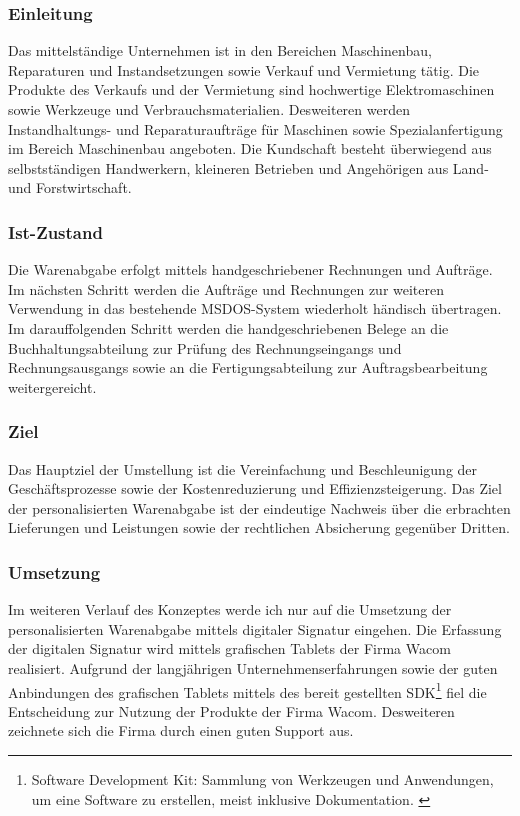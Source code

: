 \subsubsection*{Einleitung}
Das mittelständige Unternehmen ist in den Bereichen Maschinenbau, Reparaturen und Instandsetzungen sowie Verkauf und Vermietung tätig. Die Produkte des Verkaufs und der Vermietung sind hochwertige Elektromaschinen sowie Werkzeuge und Verbrauchsmaterialien. Desweiteren werden Instandhaltungs- und Reparaturaufträge für Maschinen sowie Spezialanfertigung im Bereich Maschinenbau angeboten. Die Kundschaft besteht überwiegend aus selbstständigen Handwerkern, kleineren Betrieben und Angehörigen aus Land- und Forstwirtschaft.
\subsubsection*{Ist-Zustand}
Die Warenabgabe erfolgt mittels handgeschriebener Rechnungen und Aufträge. Im nächsten Schritt werden die Aufträge und Rechnungen zur weiteren Verwendung in das bestehende MSDOS-System wiederholt händisch übertragen. Im darauffolgenden Schritt werden die handgeschriebenen Belege an die Buchhaltungsabteilung zur Prüfung des Rechnungseingangs und Rechnungsausgangs sowie an die Fertigungsabteilung zur Auftragsbearbeitung weitergereicht.
\subsubsection*{Ziel}
Das Hauptziel der Umstellung ist die Vereinfachung und Beschleunigung der Geschäftsprozesse sowie der Kostenreduzierung und Effizienzsteigerung. Das Ziel der personalisierten Warenabgabe ist der eindeutige Nachweis über die erbrachten Lieferungen und Leistungen sowie der rechtlichen Absicherung gegenüber Dritten. \cite{einleitung1}
\subsubsection*{Umsetzung}
Im weiteren Verlauf des Konzeptes werde ich nur auf die Umsetzung der personalisierten Warenabgabe mittels digitaler Signatur eingehen. Die Erfassung der digitalen Signatur wird mittels grafischen Tablets der Firma Wacom realisiert. Aufgrund der langjährigen Unternehmenserfahrungen sowie der guten Anbindungen des grafischen Tablets mittels des bereit gestellten SDK\footnote{\label{foot:4} Software Development Kit: Sammlung von Werkzeugen und Anwendungen, um eine Software zu erstellen, meist inklusive Dokumentation. \cite{SDK}} fiel die Entscheidung zur Nutzung der Produkte der Firma Wacom. Desweiteren zeichnete sich die Firma durch einen guten Support aus.  